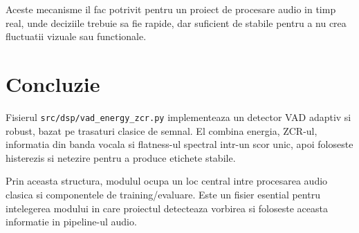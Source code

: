 \documentclass[12pt,a4paper]{report}
\begin{document}
Aceste mecanisme il fac potrivit pentru un proiect de procesare audio in timp real, unde deciziile trebuie sa fie rapide, dar suficient de stabile pentru a nu crea fluctuatii vizuale sau functionale.

\chapter{Concluzie}

Fisierul \texttt{src/dsp/vad\_energy\_zcr.py} implementeaza un detector VAD adaptiv si robust, bazat pe trasaturi clasice de semnal. El combina energia, ZCR-ul, informatia din banda vocala si flatness-ul spectral intr-un scor unic, apoi foloseste histerezis si netezire pentru a produce etichete stabile.

Prin aceasta structura, modulul ocupa un loc central intre procesarea audio clasica si componentele de training/evaluare. Este un fisier esential pentru intelegerea modului in care proiectul detecteaza vorbirea si foloseste aceasta informatie in pipeline-ul audio.
\end{document}

